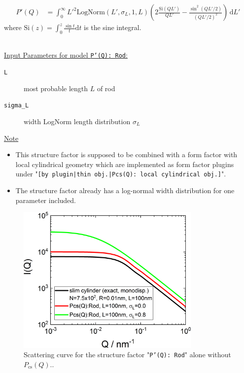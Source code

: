 \begin{align}
P'(Q) &= \int_0^\infty L'^2 \mathrm{LogNorm}(L',\sigma_L,1,L) \left(2 \frac{\mathrm{Si}(QL')}{QL'}-\frac{\sin^2(QL'/2)}{(QL'/2)^2} \right)\, \mathrm{d}L'
\label{eq:PprimeRod}
\end{align}
where $\mathrm{Si}(z)=\int_0^z\frac{\sin t}{t} \mathrm{d}t$ is the sine integral.

\vspace{5mm}

\hspace{1pt}\\
\underline{Input Parameters for model \texttt{P'(Q): Rod}:}\\
\begin{description}
\item[\texttt{L}]most probable length $L$ of rod
\item[\texttt{sigma\_L}] width LogNorm length distribution $\sigma_L$
\end{description}

\noindent
\underline{Note}
\begin{itemize}
  \item This structure factor is supposed to be combined with a form factor with local cylindrical geometry which are implemented as form factor plugins
under "\texttt{[by plugin|thin obj.|Pcs(Q): local cylindrical obj.]}".
\item The structure factor already has a log-normal width distribution for one parameter included.
\end{itemize}


\begin{figure}[htb]
\begin{center}
\includegraphics[width=0.8\textwidth,height=0.55\textwidth]{../images/form_factor/anisotropic/PprimeRod.png}
\end{center}
\caption{Scattering curve for the structure factor "\texttt{P'(Q): Rod}" alone without $P_\mathrm{cs}(Q)$..}
\label{fig_IQ:PprimeRod}
\end{figure}

